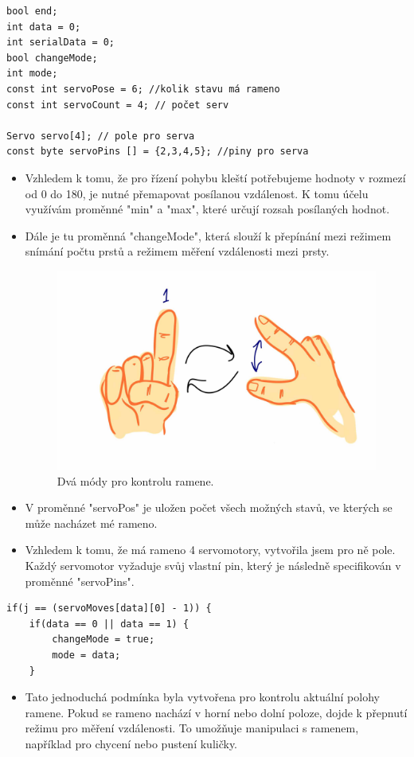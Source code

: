 \documentclass[12pt, a4paper,
twoside,        %
openright
]{report}
\begin{document}
{\begin{lstlisting}[style=Python, caption={Inicializace potřebných hodnot}]
bool end;
int data = 0;
int serialData = 0;
bool changeMode;
int mode;
const int servoPose = 6; //kolik stavu má rameno
const int servoCount = 4; // počet serv

Servo servo[4]; // pole pro serva 
const byte servoPins [] = {2,3,4,5}; //piny pro serva
\end{lstlisting}


\begin{itemize}
	\item 
	Vzhledem k tomu, že pro řízení pohybu kleští potřebujeme hodnoty v rozmezí od 0 do 180, je nutné přemapovat posílanou vzdálenost. K tomu účelu využívám proměnné "min" a "max", které určují rozsah posílaných hodnot.
	\item Dále je tu proměnná "changeMode", která slouží k přepínání mezi režimem snímání počtu prstů a režimem měření vzdálenosti mezi prsty.
\begin{figure}[h]
	
	\centering
	\includegraphics[width=0.3\linewidth]{image/mody.jpg} 
	
	
	\caption{Dvá módy pro kontrolu ramene.} %
	\label{fig:uhlyVGestech} %
\end{figure}
\item   V proměnné "servoPos" je uložen počet všech možných stavů, ve kterých se může nacházet mé rameno.
\item Vzhledem k tomu, že má rameno 4 servomotory, vytvořila jsem pro ně pole. Každý servomotor vyžaduje svůj vlastní pin, který je následně specifikován v proměnné "servoPins".
	
\end{itemize}



\begin{lstlisting}[style=Python, caption={Podmínka pro přepínání módu}]
if(j == (servoMoves[data][0] - 1)) {
	if(data == 0 || data == 1) {
		changeMode = true;
		mode = data;
	}
\end{lstlisting}

\begin{itemize}
		\item Tato jednoduchá podmínka byla vytvořena pro kontrolu aktuální polohy ramene. Pokud se rameno nachází v horní nebo dolní poloze, dojde k přepnutí režimu pro měření vzdálenosti. To umožňuje manipulaci s ramenem, například pro chycení nebo pustení kuličky.


\end{itemize}}
\end{document}
